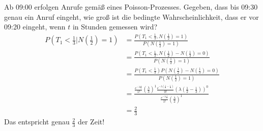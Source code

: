 \documentclass[a4paper,12pt]{article}
\begin{document}
\begin{tcolorbox}[breakable, colframe=blue, colback=white, title=Beispiel 20]
	Ab 09:00 erfolgen Anrufe gemäß eines Poisson-Prozesses. Gegeben, dass bis 09:30
	genau ein Anruf eingeht, wie groß ist die bedingte Wahrscheinlichkeit, dass er vor 09:20
	eingeht, wenn $t$ in Stunden gemessen wird?
	\begin{align*}
		P(T_1 < \frac{1}{3}| N\left(\frac{1}{2}\right) = 1)
		 & = \frac{P \left(T_1 < \frac{1}{3}, N\left(\frac{1}{2}\right)=1\right) }{P\left( N\left(\frac{1}{2}\right)=1\right)}                                          \\
		 & = \frac{P \left(T_1 < \frac{1}{3}, N\left(\frac{1}{2}\right) - N\left(\frac{1}{3}\right)=0\right) }{P\left( N\left(\frac{1}{2}\right)=1\right)}              \\
		 & = \frac{P \left(T_1 < \frac{1}{3}\right) P\left(N\left(\frac{1}{2}\right) - N\left(\frac{1}{3}\right)=0\right) }{P\left( N\left(\frac{1}{2}\right)=1\right)} \\
		 & = \frac{
			\frac{e^{-\lambda \frac{1}{3}}}{1!}\left(\frac{\lambda}{3}\right)^1
			\frac{e^{-\lambda \left(\frac{1}{2} - \frac{1}{3}\right)}}{0!}\left(\lambda\left(\frac{1}{2} - \frac{1}{3}\right) \right)^0
		}
		{\frac{e^{-\lambda \frac{1}{2}}}{1!}\left(\frac{\lambda}{2}\right)^{1}}                                                                                         \\
		 & = \frac{2}{3}
	\end{align*}
	Das entspricht genau $\frac{2}{3}$ der Zeit!
\end{tcolorbox}
\end{document}
